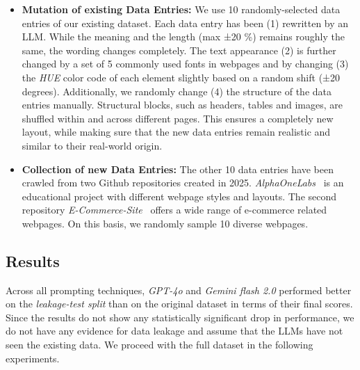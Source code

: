 \begin{itemize}
  \item \textbf{Mutation of existing Data Entries:} We use 10 randomly-selected data entries of our existing 
  dataset. Each data entry has been (1) rewritten by an LLM. While the meaning
    and the length (max ±20 \%) remains roughly the same, the wording changes
    completely. The text appearance (2) is further changed by a set of 5 commonly used fonts in webpages and 
    by changing (3) the \textit{HUE} color code of each element slightly based on a random shift (±20 degrees). \newline
    Additionally, we randomly change (4) the structure of the data entries manually. Structural 
    blocks, such as headers, tables and images, are shuffled within and across different 
    pages. This ensures a completely new layout, while making sure that the new data entries 
    remain realistic and similar to their real-world origin.

  \item \textbf{Collection of new Data Entries:} The other 10 data entries have been crawled from 
    two Github repositories created in 2025. \textit{AlphaOneLabs}~\parencite{alphaonelabs_education} is an educational project 
    with different webpage styles and layouts. The second repository \textit{E-Commerce-Site}~\parencite{nuranferhan_ecommerce}
    offers a wide range of e-commerce related webpages. On this basis, we 
    randomly sample 10 diverse webpages.
\end{itemize}


\subsection{Results}
Across all prompting techniques, \textit{GPT-4o} and \textit{Gemini flash 2.0} 
performed better on the 
\textit{leakage-test split} than on the original dataset in terms of their final scores.
Since the results do not show any statistically significant drop in performance, we 
do not have any evidence for data leakage and assume that the LLMs have not seen the existing 
data. We proceed with the full dataset in the following experiments.


